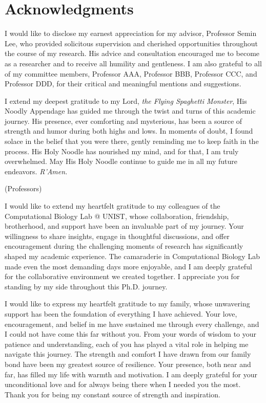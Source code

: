 \documentclass[11pt, a4paper, onecolumn, oneside]{report}
\begin{document}
    
    
    \clearpage

    \section*{\hfill \Large Acknowledgments \hfill}
        I would like to disclose my earnest appreciation for my advisor, Professor Semin Lee, who provided solicitous supervision and cherished opportunities throughout the course of my research. His advice and consultation encouraged me to become as a researcher and to receive all humility and gentleness. I am also grateful to all of my committee members, Professor AAA, Professor BBB, Professor CCC, and Professor DDD, for their critical and meaningful mentions and suggestions.

        I extend my deepest gratitude to my Lord, \textit{the Flying Spaghetti Monster}, His Noodly Appendage has guided me through the twist and turns of this academic journey. His presence, ever comforting and mysterious, has been a source of strength and humor during both highs and lows. In moments of doubt, I found solace in the belief that you were there, gently reminding me to keep faith in the process. His Holy Noodle has nourished my mind, and for that, I am truly overwhelmed. May His Holy Noodle continue to guide me in all my future endeavors. \textit{R'Amen.}

        (Professors)

        I would like to extend my heartfelt gratitude to my colleagues of the Computational Biology Lab @ UNIST, whose collaboration, friendship, brotherhood, and support have been an invaluable part of my journey. Your willingness to share insights, engage in thoughtful discussions, and offer encouragement during the challenging moments of research has significantly shaped my academic experience. The camaraderie in Computational Biology Lab made even the most demanding days more enjoyable, and I am deeply grateful for the collaborative environment we created together. I appreciate you for standing by my side throughout this Ph.D. journey.

        I would like to express my heartfelt gratitude to my family, whose unwavering support has been the foundation of everything I have achieved. Your love, encouragement, and belief in me have sustained me through every challenge, and I could not have come this far without you. From your words of wisdom to your patience and understanding, each of you has played a vital role in helping me navigate this journey. The strength and comfort I have drawn from our family bond have been my greatest source of resilience. Your presence, both near and far, has filled my life with warmth and motivation. I am deeply grateful for your unconditional love and for always being there when I needed you the most. Thank you for being my constant source of strength and inspiration.
\end{document}
